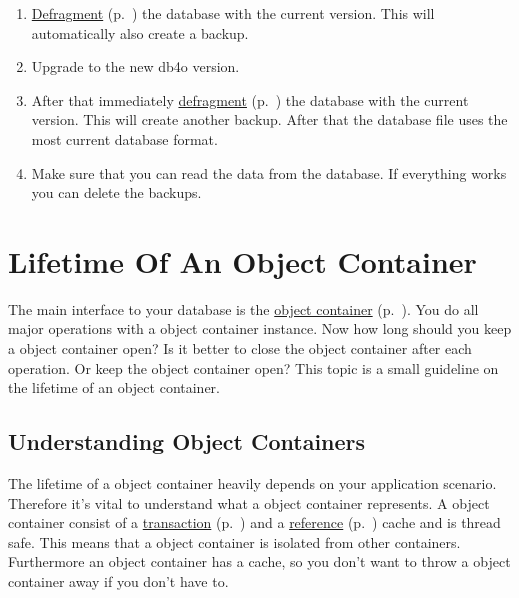 \begin{enumerate}
\item \hyperref[ref:advanced-topics-defragment]{Defragment} (p.~\pageref{ref:advanced-topics-defragment}) the database with the current version. This will automatically also create a backup.
\item Upgrade to the new db4o version.
\item After that immediately \hyperref[ref:advanced-topics-defragment]{defragment} (p.~\pageref{ref:advanced-topics-defragment}) the database with the current version. This will create another backup. After that the database file uses the most current database format.
\item Make sure that you can read the data from the database. If everything works you can delete the backups.
\end{enumerate}

\section{Lifetime Of An Object Container}
\label{ref:best-practises-lifetime-of-a-objectcontainer}

The main interface to your database is the \hyperref[ref:basics-object-container]{object container} (p.~\pageref{ref:basics-object-container}). You do all major operations with a object container instance. Now how long should you keep a object container open? Is it better to close the object container after each operation. Or keep the object container open? This topic is a small guideline on the lifetime of an object container.

\subsection*{Understanding Object Containers}

The lifetime of a object container heavily depends on your application scenario. Therefore it's vital to understand what a object container represents. A object container consist of a \hyperref[ref:basics-acid-and-transactions]{transaction} (p.~\pageref{ref:basics-acid-and-transactions}) and a \hyperref[ref:basics-indentity-concept-reference-cache]{reference} (p.~\pageref{ref:basics-indentity-concept-reference-cache}) cache and is thread safe. This means that a object container is isolated from other containers. Furthermore an object container has a cache, so you don't want to throw a object container away if you don't have to.


